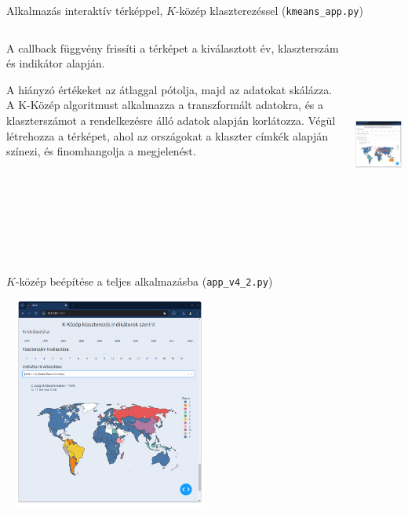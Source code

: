 \documentclass[english, aspectratio=169]{beamer}
\begin{document}
	\begin{frame}{Alkalmazás interaktív térképpel, $K$-közép klaszterezéssel (\texttt{kmeans\_app.py})}
		\begin{columns}
			\begin{column}{.5\textwidth}
				A callback függvény frissíti a térképet a kiválasztott év, klaszterszám és indikátor alapján.\par\smallskip
				A hiányzó értékeket az átlaggal pótolja, majd az adatokat skálázza. A K-Közép algoritmust alkalmazza a transzformált adatokra, és a klaszterszámot a rendelkezésre álló adatok alapján korlátozza. Végül létrehozza a térképet, ahol az országokat a klaszter címkék alapján színezi, és finomhangolja a megjelenést.
			\end{column}
			\begin{column}{.5\textwidth}
				\begin{center}
					\includegraphics[width=7cm, height=7cm, keepaspectratio]{images/freq_19.png}
				\end{center}
			\end{column}
		\end{columns}
	\end{frame}
	
	\begin{frame}{$K$-közép beépítése a teljes alkalmazásba (\texttt{app\_v4\_2.py})}
		\begin{center}
			\includegraphics[width=7cm, height=7cm, keepaspectratio]{images/freq_20.png}
		\end{center}
	\end{frame}
	
\end{document}
